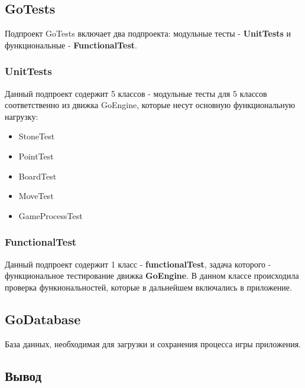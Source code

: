 \subsection*{GoTests}

Подпроект GoTests включает два подпроекта: модульные тесты - \textbf{UnitTests} и функциональные - \textbf{FunctionalTest}.\\

\subsubsection*{UnitTests}

Данный подпроект содержит 5 классов - модульные тесты для 5 классов соответственно из движка GoEngine, которые несут основную функциональную нагрузку:

\begin{itemize}
	\item StoneTest\\
	\item PointTest\\
	\item BoardTest\\
	\item MoveTest\\
	\item GameProcessTest\\
\end{itemize}

\subsubsection*{FunctionalTest}

Данный подпроект содержит 1 класс - \textbf{functionalTest}, задача которого - функциональное тестирование движка \textbf{GoEngine}. В данном классе происходила проверка функиональностей, которые в дальнейшем включались в приложение.

\subsection*{GoDatabase}

База данных, необходимая для загрузки и сохранения процесса игры приложения.\\

\subsection*{Вывод}

